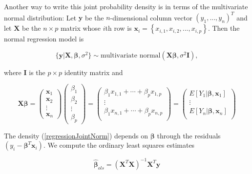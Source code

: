 \documentclass[12pt, a4paper]{article}
\begin{document}
Another way to write this joint probability density is in terms of the multivariate normal distribution:  Let $\mathbf{y}$ be the $n$-dimensional column vector $\left(y_1,...,y_n\right)^T$ and let $\mathbf{X}$ be the $n \times p$ matrix whose $i$th row is $\mathbf{x}_i = \left\{ x_{i,1}, x_{i,2}, ..., x_{i,p} \right\}$.  Then the normal regression model is

$$\{\mathbf{y}|\mathbf{X},\boldsymbol\beta,\sigma^2\} \sim \text{multivariate normal}\left(\mathbf{X}\boldsymbol\beta,\sigma^2\mathbf{I}\right),$$

where $\mathbf{I}$ is the $p \times p$ identity matrix and

\begin{equation*}
    \mathbf{X}\boldsymbol\beta =
    \begin{pmatrix}
        \mathbf{x}_1 \\
        \mathbf{x}_2 \\
        \vdots  \\
        \mathbf{x}_n
    \end{pmatrix}
    \begin{pmatrix}
        \beta_1 \\
        \beta_2 \\
        \vdots \\
        \beta_p
    \end{pmatrix}
    =
    \begin{pmatrix}
        \beta_1 x_{1,1} + \cdots + \beta_p x_{1,p} \\
        \vdots \\
        \beta_1 x_{n,1} + \cdots + \beta_p x_{n,p} \\
    \end{pmatrix}
    =
    \begin{pmatrix}
        E\left[Y_1|\mathbf{\boldsymbol\beta},\mathbf{x}_1\right] \\
        \vdots \\
        E\left[Y_n|\mathbf{\boldsymbol\beta},\mathbf{x}_n\right] \\
    \end{pmatrix}
\end{equation*}

The density (\ref{regressionJointNorm}) depends on $\boldsymbol\beta$ through the residuals $\left(y_i - \boldsymbol\beta^T\mathbf{x}_i\right)$.  We compute the ordinary least squares estimates

$$\hat{\boldsymbol\beta}_{ols} = \left(\mathbf{X}^T\mathbf{X}\right)^{-1}\mathbf{X}^T\mathbf{y}$$
\end{document}
